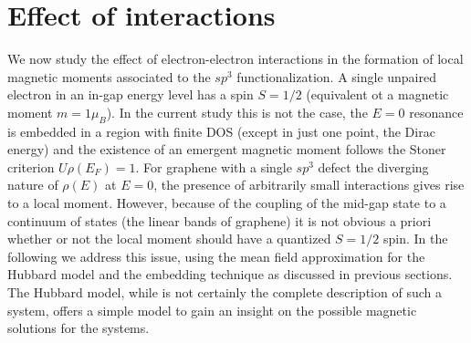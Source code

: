 \section{Effect of interactions}
\label{sec:MF}
We now study the effect of electron-electron interactions in the formation of local magnetic moments associated to the $sp^3$ functionalization. A single unpaired electron in an in-gap energy level has a spin $S=1/2$ (equivalent ot a magnetic moment $m=1\mu_B$). In the current study this is not the case, the $E=0$ resonance is embedded in a region with finite DOS (except in just one point, the Dirac energy) and the existence of an emergent magnetic moment follows the Stoner criterion $U\rho(E_F)=1$. For graphene with a single $sp^3$ defect the diverging nature of $\rho(E)$ at $E=0$, the presence of arbitrarily small interactions gives rise to a local moment.
However, because of the coupling of the mid-gap state to a continuum of states (the linear bands of graphene) it is not obvious a priori whether or not the local moment should have a quantized $S=1/2$ spin.
In the following we address this issue, using the mean field approximation for the Hubbard model and the embedding technique as discussed in previous sections. The Hubbard model, while is not certainly the complete description of such a system, offers a simple model to gain an insight on the possible magnetic solutions for the systems.


